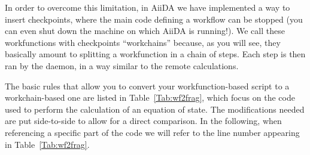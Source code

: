In order to overcome this limitation, in AiiDA we have implemented a way to insert checkpoints, where the main code defining a workflow can be stopped (you can even shut down the machine on which AiiDA is running!). We call these workfunctions with checkpoints ``workchains'' because, as you will see, they basically amount to splitting a workfunction in a chain of steps. Each step is then ran by the daemon, in a way similar to the remote calculations.

The basic rules that allow you to convert your workfunction-based script to a workchain-based one are listed in Table~\ref{Tab:wf2frag}, which focus on the code used to perform the calculation of an equation of state. The modifications needed are put side-to-side to allow for a direct comparison. In the following, when referencing a specific part of the code we will refer to the line number appearing in Table~\ref{Tab:wf2frag}. 

